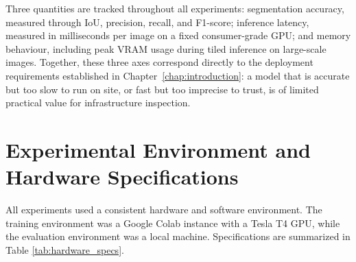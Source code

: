 \hs Three quantities are tracked throughout all experiments: segmentation accuracy, measured through IoU, precision, recall, and F1-score; inference latency, measured in milliseconds per image on a fixed consumer-grade GPU; and memory behaviour, including peak VRAM usage during tiled inference on large-scale images. Together, these three axes correspond directly to the deployment requirements established in Chapter~\ref{chap:introduction}: a model that is accurate but too slow to run on site, or fast but too imprecise to trust, is of limited practical value for infrastructure inspection.

\newpage

\section{Experimental Environment and Hardware Specifications}
\label{sec:experimental_environment_and_hardware_specifications}
\hs All experiments used a consistent hardware and software environment. The training environment was a Google Colab instance with a Tesla T4 GPU, while the evaluation environment was a local machine. Specifications are summarized in Table \ref{tab:hardware_specs}.

